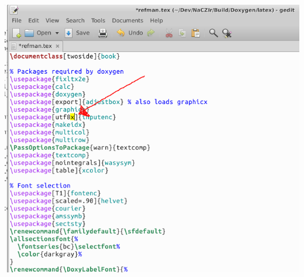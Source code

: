 \begin{DoxyImage}
\includegraphics[width=\textwidth,height=\textheight/2,keepaspectratio=true]{doxygen_2.PNG}
\end{DoxyImage}
